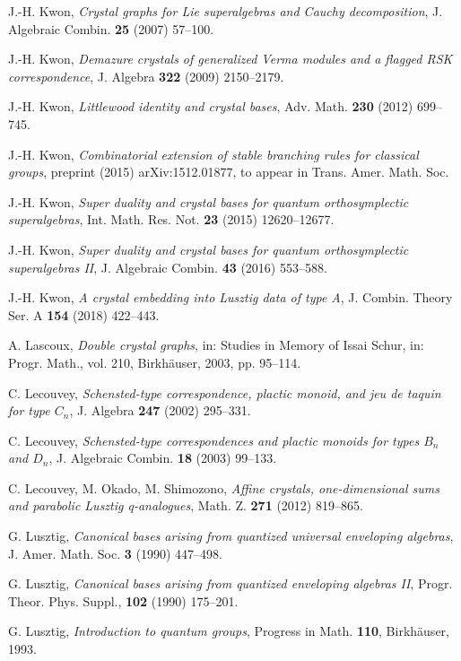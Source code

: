 \documentclass[leqno,11pt]{amsart}
\numberwithin{equation}{section}
\begin{document}
{\begin{thebibliography}{HK}
J.-H. Kwon, {\em Crystal graphs for Lie superalgebras and Cauchy decomposition}, J. Algebraic Combin. \textbf{25} (2007) 57--100.

J.-H. Kwon,
{\em Demazure crystals of generalized Verma modules and a flagged RSK correspondence}, 
J. Algebra \textbf{322} (2009) 2150--2179.

J.-H. Kwon, {\em Littlewood identity and crystal bases}, Adv. Math. \textbf{230} (2012) 699--745.

J.-H. Kwon, {\em Combinatorial extension of stable branching rules for classical groups},  preprint (2015) arXiv:1512.01877, to appear in Trans. Amer. Math. Soc.

J.-H. Kwon,  {\em Super duality and crystal bases for quantum orthosymplectic
superalgebras}, Int. Math. Res. Not. \textbf{23} (2015) 12620--12677.

J.-H. Kwon,  {\em Super duality and crystal bases for quantum orthosymplectic
superalgebras II}, J. Algebraic Combin. \textbf{43} (2016) 553--588.

J.-H. Kwon, {\em A crystal embedding into Lusztig data of type A},  J. Combin. Theory Ser. A \textbf{154} (2018) 422--443.

A. Lascoux, {\em Double crystal graphs}, in: Studies in Memory of Issai Schur, in: Progr. Math., vol. 210, Birkh\"{a}user, 2003, pp. 95--114.

C. Lecouvey, {\em Schensted-type correspondence, plactic monoid, and jeu de taquin for type $C_n$}, J. Algebra \textbf{247} (2002) 295--331.

C. Lecouvey, {\em Schensted-type correspondences and plactic monoids for types $B_n$ and $D_n$}, J. Algebraic Combin. \textbf{18} (2003) 99--133.

C. Lecouvey, M. Okado, M. Shimozono, {\em Affine crystals, one-dimensional sums and parabolic Lusztig q-analogues}, Math. Z. \textbf{271} (2012) 819--865.

G. Lusztig, {\em Canonical bases arising from quantized universal enveloping algebras},  J. Amer. Math. Soc. \textbf{3}  (1990)  447--498.

G. Lusztig, {\em Canonical bases arising from quantized enveloping algebras II}, Progr. Theor. Phys. Suppl., \textbf{102} (1990)  175--201.

G. Lusztig, {\em Introduction to quantum groups}, Progress in Math. \textbf{110}, Birkh\"{a}user, 1993.


\end{thebibliography}}
\end{document}
